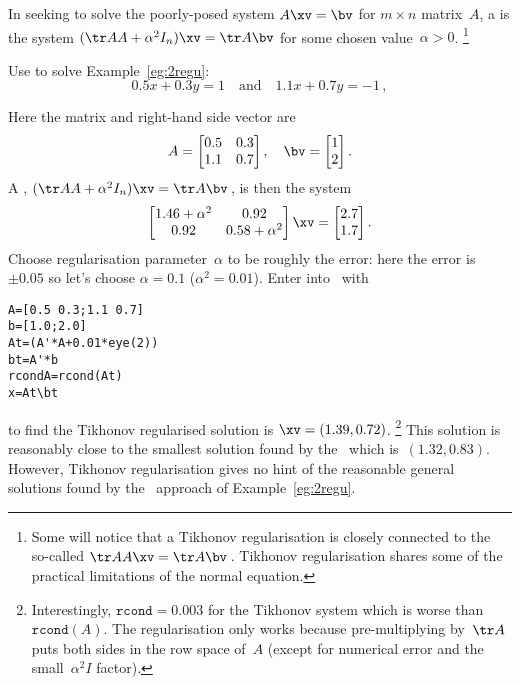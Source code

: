 \begin{definition} \label{def:Tikreg}
In seeking to solve the poorly-posed system \(A\xv=\bv\) for \(m\times n\) matrix~\(A\), a  is the system \((\tr AA+\alpha^2I_n)\xv=\tr A\bv\) for some chosen  value~\(\alpha>0\).
\footnote{Some will notice that a Tikhonov regularisation is closely connected to the so-called  \(\tr AA\xv=\tr A\bv\)\,.  
Tikhonov regularisation shares some of the practical limitations of the normal equation.}
\end{definition}


\begin{example} \label{eg:}
Use  to solve Example~\ref{eg:2regu}:
\begin{equation*}
0.5x+0.3y=1\quad\text{and}\quad 1.1x+0.7y=-1\,,
\end{equation*}
\begin{solution} 
Here the matrix and right-hand side vector are
\begin{equation*}
A=\begin{bmatrix} 0.5&0.3\\1.1&0.7 \end{bmatrix},\quad
\bv=\begin{bmatrix} 1\\2 \end{bmatrix}.
\end{equation*}
A , \((\tr AA+\alpha^2I_n)\xv=\tr A\bv\)\,, is then the system
\begin{equation*}
\begin{bmatrix} 1.46+\alpha^2&0.92\\0.92&0.58+\alpha^2 \end{bmatrix}\xv=\begin{bmatrix} 2.7\\1.7 \end{bmatrix}.
\end{equation*}
Choose regularisation parameter~\(\alpha\) to be roughly the error: here the error is~\(\pm0.05\) so let's choose \(\alpha=0.1\) (\(\alpha^2=0.01\)).
Enter into \script\ with
\begin{verbatim}
A=[0.5 0.3;1.1 0.7]
b=[1.0;2.0]
At=(A'*A+0.01*eye(2))
bt=A'*b
rcondA=rcond(At)
x=At\bt
\end{verbatim}
\setbox\ajrqrbox\hbox{}%
\marginpar{\usebox{\ajrqrbox\\[2ex]}}%
to find the Tikhonov regularised solution is \(\xv=(1.39,0.72)\).%
\footnote{Interestingly, \(\texttt{rcond}=0.003\) for the Tikhonov system which is worse than \(\texttt{rcond}(A)\).  The regularisation only works because pre-multiplying by~\(\tr A\) puts both sides in the row space of~\(A\) (except for numerical error and the small~\(\alpha^2I\) factor).}
This solution is reasonably close to the smallest solution found by the \svd\ which is~\((1.32,0.83)\).
However, Tikhonov regularisation gives no hint of the reasonable general solutions found by the \svd\ approach of Example~\ref{eg:2regu}.


\end{solution}
\end{example}
